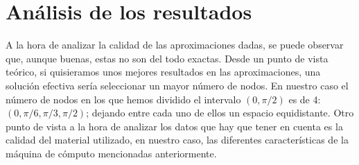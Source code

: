 \section{Análisis de los resultados}
\label{3:sec:4}
A la hora de analizar la calidad de las aproximaciones dadas, se puede observar que, aunque buenas, estas no son del todo exactas. Desde un punto de vista teórico, si quisieramos unos mejores resultados en las aproximaciones, una solución efectiva sería seleccionar un mayor número de nodos. En nuestro caso el número de nodos en los que hemos dividido el intervalo $(0, \pi/2)$ es de 4: $(0, \pi/6, \pi/3, \pi/2)$; dejando entre cada uno de ellos un espacio equidistante.
Otro punto de vista a la hora de analizar los datos que hay que tener en cuenta es la calidad del material utilizado, en nuestro caso, las diferentes características de la máquina de cómputo mencionadas anteriormente.
